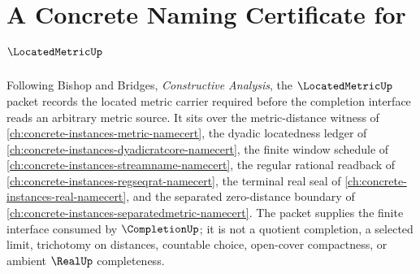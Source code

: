 \chapter{A Concrete Naming Certificate for $\LocatedMetricUp$}
\label{ch:concrete-instances-locatedmetric-namecert}

Following Bishop and Bridges, \emph{Constructive Analysis}, the $\LocatedMetricUp$ packet records the located metric carrier required before the completion interface reads an arbitrary metric source. It sits over the metric-distance witness of \autoref{ch:concrete-instances-metric-namecert}, the dyadic locatedness ledger of \autoref{ch:concrete-instances-dyadicratcore-namecert}, the finite window schedule of \autoref{ch:concrete-instances-streamname-namecert}, the regular rational readback of \autoref{ch:concrete-instances-regseqrat-namecert}, the terminal real seal of \autoref{ch:concrete-instances-real-namecert}, and the separated zero-distance boundary of \autoref{ch:concrete-instances-separatedmetric-namecert}. The packet supplies the finite interface consumed by $\CompletionUp$; it is not a quotient completion, a selected limit, trichotomy on distances, countable choice, open-cover compactness, or ambient $\RealUp$ completeness.

